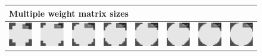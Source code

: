 \documentclass{itatnew}
\begin{document}
\begin{figure}[htp]
  \centering
  \begin{tabular}{cccccccc}
    \multicolumn{8}{l}{Multiple weight matrix sizes} \\
    \hline
    \includegraphics[width=4.6em]{images/gen-blur-wmatrices-1}&
    \includegraphics[width=4.6em]{images/gen-blur-wmatrices-2}&
    \includegraphics[width=4.6em]{images/gen-blur-wmatrices-3}&
    \includegraphics[width=4.6em]{images/gen-blur-wmatrices-4}&
    \includegraphics[width=4.6em]{images/gen-blur-wmatrices-5}&
    \includegraphics[width=4.6em]{images/gen-blur-wmatrices-6}&
    \includegraphics[width=4.6em]{images/gen-blur-wmatrices-7}&
    \includegraphics[width=4.6em]{images/gen-blur-wmatrices-8}
  \end{tabular}
  

\end{figure}
\end{document}
